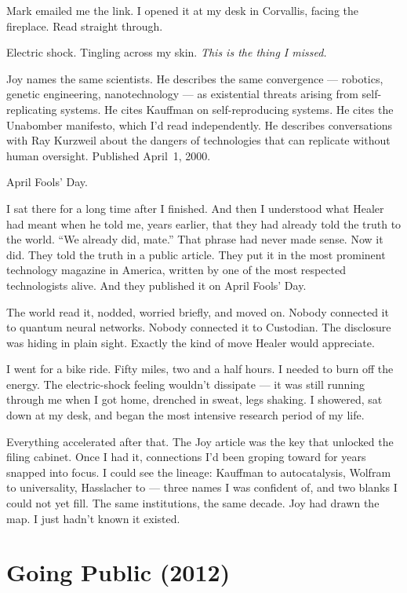 Mark emailed me the link. I opened it at my desk in Corvallis, facing the fireplace. Read straight through.

Electric shock. Tingling across my skin. \textit{This is the thing I missed.}

Joy names the same scientists. He describes the same convergence --- robotics, genetic engineering, nanotechnology --- as existential threats arising from self-replicating systems. He cites Kauffman on self-reproducing systems. He cites the Unabomber manifesto, which I'd read independently. He describes conversations with Ray Kurzweil about the dangers of technologies that can replicate without human oversight. Published April~1, 2000.

April Fools' Day.

I sat there for a long time after I finished. And then I understood what Healer had meant when he told me, years earlier, that they had already told the truth to the world. ``We already did, mate.'' That phrase had never made sense. Now it did. They told the truth in a public article. They put it in the most prominent technology magazine in America, written by one of the most respected technologists alive. And they published it on April Fools' Day.

The world read it, nodded, worried briefly, and moved on. Nobody connected it to quantum neural networks. Nobody connected it to Custodian. The disclosure was hiding in plain sight. Exactly the kind of move Healer would appreciate.

I went for a bike ride. Fifty miles, two and a half hours. I needed to burn off the energy. The electric-shock feeling wouldn't dissipate --- it was still running through me when I got home, drenched in sweat, legs shaking. I showered, sat down at my desk, and began the most intensive research period of my life.

Everything accelerated after that. The Joy article was the key that unlocked the filing cabinet. Once I had it, connections I'd been groping toward for years snapped into focus. I could see the lineage: Kauffman to autocatalysis, Wolfram to universality, Hasslacher to  --- three names I was confident of, and two blanks I could not yet fill. The same institutions, the same decade. Joy had drawn the map. I just hadn't known it existed.

\section*{Going Public (2012)}
\label{pos29:going-public}

